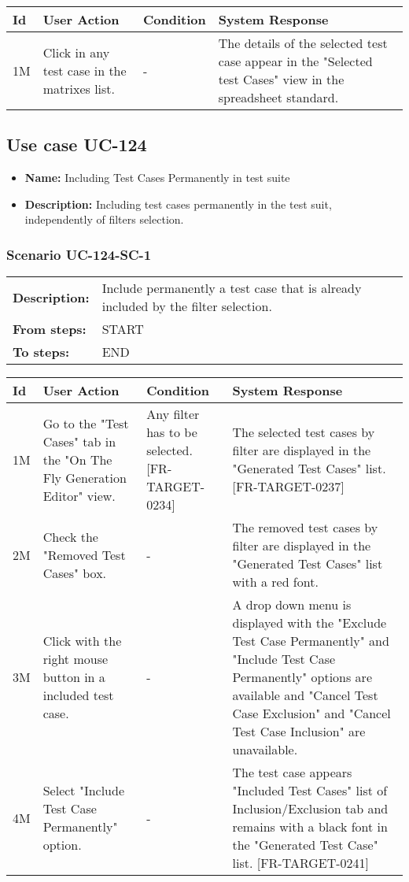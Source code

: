 \documentclass[a4paper,11pt]{article}
\newcommand{\bl}{\\ \hline}
\begin{document}
\begin{tabular}{|p{0.8in}|p{1.6in}|p{1.6in}|p{1.6in}|}
\hline
Id & User Action & Condition & System Response  \bl 
1M & Click in any test case in the matrixes list. & - & The details of the selected test case appear in the "Selected test Cases" view in the spreadsheet standard. \bl 
\end{tabular}
\subsection*{Use case UC-124}
\begin{itemize}
\item {\bf Name: }Including Test Cases Permanently in test suite
\item {\bf Description: }Including test cases permanently in the test suit, independently of filters selection.
\end{itemize}
\subsubsection*{Scenario UC-124-SC-1}
\begin{tabular}{p{1in}p{4in}}
{\bf Description:} & Include permanently a test case that is already included by the filter selection. \\
{\bf From steps:} & START \\
{\bf To steps:} & END \\
\end{tabular}
 
\begin{tabular}{|p{0.8in}|p{1.6in}|p{1.6in}|p{1.6in}|}
\hline
Id & User Action & Condition & System Response  \bl 
1M & Go to the "Test Cases" tab in the "On The Fly Generation Editor" view. & Any filter has to be selected. [FR-TARGET-0234] & The selected test cases by filter are displayed in the "Generated Test Cases" list. [FR-TARGET-0237] \bl 
2M & Check the "Removed Test Cases" box. & - & The removed test cases by filter are displayed in the "Generated Test Cases" list with a red font. \bl 
3M & Click with the right mouse button in a included test case. & - & A drop down menu is displayed with the "Exclude Test Case Permanently" and "Include Test Case Permanently" options are available and "Cancel Test Case Exclusion" and "Cancel Test Case Inclusion" are unavailable. \bl 
4M & Select "Include Test Case Permanently" option. & - & The test case appears "Included Test Cases" list of Inclusion/Exclusion tab and remains with a black font in the "Generated Test Case" list. [FR-TARGET-0241] \bl 
\end{tabular}
\end{document}
